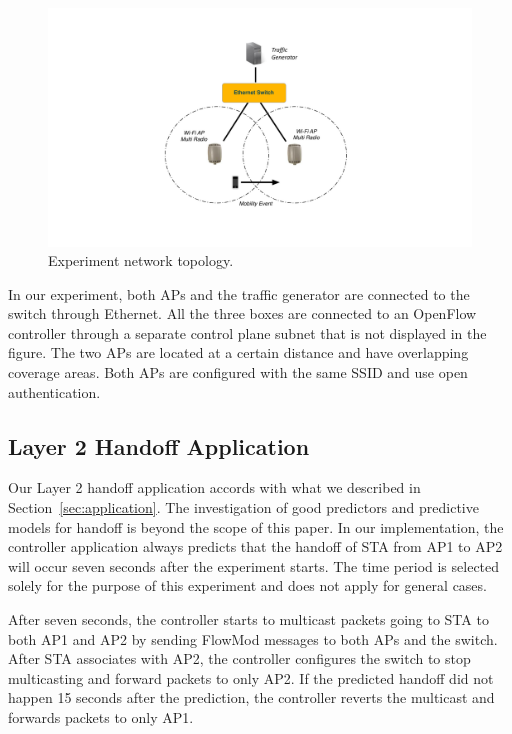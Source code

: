 \begin{figure}
\centering
\includegraphics[width=1.0\textwidth]{figures/topology}
\caption[\aetherflow experiment network topology]{\aetherflow Experiment network topology\protect\footnotemark.}
\label{fig:topology}
\end{figure}

In our experiment, both APs and the traffic generator are connected to the switch
through  Ethernet. All the three boxes are connected to an OpenFlow
controller through a separate control plane subnet that is not displayed in the
figure.  The two APs are located at a certain distance and have overlapping coverage areas.  Both APs are configured with
the same SSID and use open authentication. 

\subsection{Layer 2 Handoff Application}
Our Layer 2 handoff application accords with what we described in
Section~\ref{sec:application}. The investigation of good
predictors and predictive models for handoff is beyond the scope of this paper.
In our implementation, the controller application always predicts that the
handoff of STA from AP1 to AP2 will occur seven seconds after the experiment starts.
The time period is selected solely for the purpose of this experiment and
does not apply for general cases. 
 
After seven seconds, the controller starts to multicast packets going to STA to both
AP1 and AP2 by sending FlowMod messages to both APs and the switch. After STA
associates with AP2, the controller configures the switch to stop multicasting
and forward packets to only AP2. If the predicted handoff did not happen 15
seconds after the prediction, the controller reverts the multicast and forwards
packets to only AP1.



